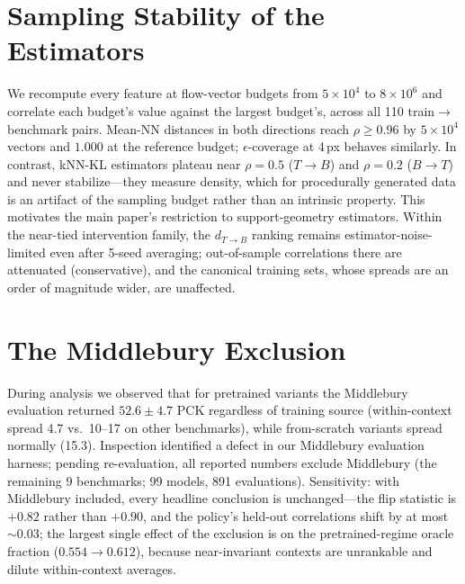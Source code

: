 \documentclass[runningheads]{llncs}
\newcommand{\dtb}{d_{T\to B}}
\newcommand{\pck}{PCK}
\begin{document}
\section{Sampling Stability of the Estimators}
\label{supp:sampling}

We recompute every feature at flow-vector budgets from $5{\times}10^4$ to
$8{\times}10^6$ and correlate each budget's value against the largest
budget's, across all 110 train$\to$benchmark pairs. Mean-NN distances in both
directions reach $\rho \ge 0.96$ by $5{\times}10^4$ vectors and $1.000$ at
the reference budget; $\epsilon$-coverage at 4\,px behaves similarly. In
contrast, kNN-KL estimators plateau near $\rho{=}0.5$ ($T{\to}B$) and
$\rho{=}0.2$ ($B{\to}T$) and never stabilize---they measure density, which
for procedurally generated data is an artifact of the sampling budget rather
than an intrinsic property. This motivates the main paper's restriction to
support-geometry estimators. Within the near-tied intervention family, the
$\dtb$ ranking remains estimator-noise-limited even after 5-seed averaging;
out-of-sample correlations there are attenuated (conservative), and the
canonical training sets, whose spreads are an order of magnitude wider, are
unaffected.

\section{The Middlebury Exclusion}
\label{supp:mid}

During analysis we observed that for pretrained variants the Middlebury
evaluation returned $52.6 \pm 4.7$ \pck{} regardless of training source
(within-context spread 4.7 vs.\ 10--17 on other benchmarks), while
from-scratch variants spread normally (15.3). Inspection identified a defect
in our Middlebury evaluation harness; pending re-evaluation, all reported
numbers exclude Middlebury (the remaining 9 benchmarks; 99 models, 891
evaluations). Sensitivity: with Middlebury included, every headline conclusion
is unchanged---the flip statistic is $+0.82$ rather than $+0.90$, and the
policy's held-out correlations shift by at most ${\sim}0.03$; the largest
single effect of the exclusion is on the pretrained-regime oracle fraction
($0.554\!\to\!0.612$), because
near-invariant contexts are unrankable and dilute within-context averages.

\end{document}
